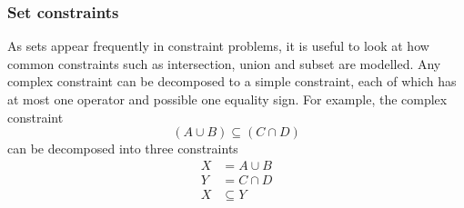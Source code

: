 \documentclass[CS4402-Notes.tex]{subfiles}
\begin{document}
\subsubsection{Set constraints}
As sets appear frequently in constraint problems, it is useful to look at how common constraints such as intersection, union and subset are modelled. Any complex constraint can be decomposed to a simple constraint, each of which has at most one operator and possible one equality sign. For example, the complex constraint
\begin{equation}
(A \cup B) \subseteq (C \cap D)
\end{equation}
can be decomposed into three constraints
\begin{align}
  X &= A \cup B \\
  Y &= C \cap D \\
  X &\subseteq Y
\end{align}
\end{document}
